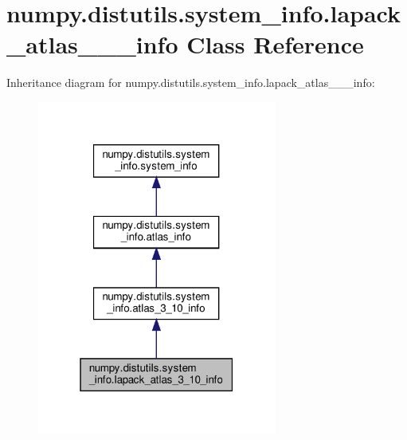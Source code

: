 \hypertarget{classnumpy_1_1distutils_1_1system__info_1_1lapack__atlas__3__10__info}{}\section{numpy.\+distutils.\+system\+\_\+info.\+lapack\+\_\+atlas\+\_\+\_\+\_\+info Class Reference}
\label{classnumpy_1_1distutils_1_1system__info_1_1lapack__atlas__3__10__info}


Inheritance diagram for numpy.\+distutils.\+system\+\_\+info.\+lapack\+\_\+atlas\+\_\+\_\+\_\+info\+:
\nopagebreak
\begin{figure}[H]
\begin{center}
\leavevmode
\includegraphics[width=223pt]{classnumpy_1_1distutils_1_1system__info_1_1lapack__atlas__3__10__info__inherit__graph}
\end{center}
\end{figure}


